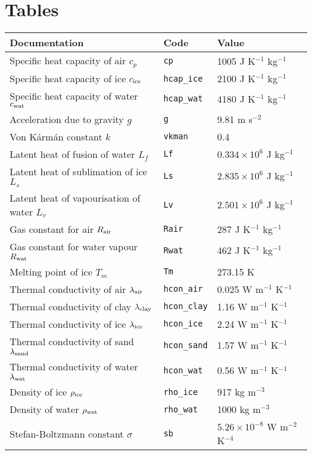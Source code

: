 \documentclass{article}
\begin{document}
\section*{Tables}
\parindent0pt
\begin{tabular}{|l|l|l|}
\hline
Documentation & Code & Value \\
\hline
Specific heat capacity of air $c_p$ & {\tt cp} & 1005 J K$^{-1}$ kg$^{-1}$ \\
Specific heat capacity of ice $c_{\rm ice}$ & {\tt hcap\_ice} & 2100 J K$^{-1}$ kg$^{-1}$ \\
Specific heat capacity of water $c_{\rm wat}$ & {\tt hcap\_wat} & 4180 J K$^{-1}$ kg$^{-1}$ \\
Acceleration due to gravity $g$ & {\tt g} & 9.81 m s$^{-2}$ \\ 
Von K\'arm\'an constant $k$ & {\tt vkman} & 0.4 \\
Latent heat of fusion of water $L_f$ & {\tt Lf} & $0.334 \times 10^6$ J kg$^{-1}$ \\
Latent heat of sublimation of ice $L_s$ & {\tt Ls} & $2.835 \times 10^6$ J kg$^{-1}$ \\
Latent heat of vapourisation of water $L_v$ & {\tt Lv} & $2.501 \times 10^6$ J kg$^{-1}$ \\
Gas constant for air $R_{\rm air}$ & {\tt Rair} & 287 J K$^{-1}$ kg$^{-1}$ \\
Gas constant for water vapour $R_{\rm wat}$ & {\tt Rwat} & 462 J K$^{-1}$ kg$^{-1}$ \\
Melting point of ice $T_m$ & {\tt Tm} & 273.15 K \\
Thermal conductivity of air $\lambda_{\rm air}$ & {\tt hcon\_air} & 0.025 W m$^{-1}$ K$^{-1}$ \\
Thermal conductivity of clay $\lambda_{\rm clay}$ & {\tt hcon\_clay} & 1.16 W m$^{-1}$ K$^{-1}$ \\
Thermal conductivity of ice $\lambda_{\rm ice}$ & {\tt hcon\_ice} & 2.24 W m$^{-1}$ K$^{-1}$ \\
Thermal conductivity of sand $\lambda_{\rm sand}$ & {\tt hcon\_sand} & 1.57 W m$^{-1}$ K$^{-1}$ \\
Thermal conductivity of water $\lambda_{\rm wat}$ & {\tt hcon\_wat} & 0.56 W m$^{-1}$ K$^{-1}$ \\
Density of ice $\rho_{\rm ice}$ & {\tt rho\_ice} & 917 kg m$^{-3}$ \\
Density of water $\rho_{\rm wat}$ & {\tt rho\_wat} & 1000 kg m$^{-3}$ \\
Stefan-Boltzmann constant $\sigma$ & {\tt sb} & $5.26 \times 10^{-8}$ W m$^{-2}$ K$^{-4}$ \\
\hline 
\end{tabular}
\end{document}
